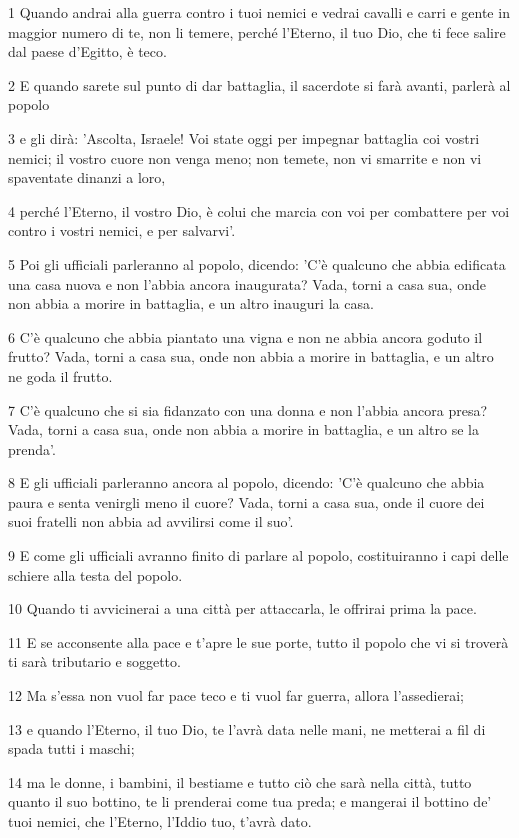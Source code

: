 \par 1 Quando andrai alla guerra contro i tuoi nemici e vedrai cavalli e carri e gente in maggior numero di te, non li temere, perché l'Eterno, il tuo Dio, che ti fece salire dal paese d'Egitto, è teco.
\par 2 E quando sarete sul punto di dar battaglia, il sacerdote si farà avanti, parlerà al popolo
\par 3 e gli dirà: 'Ascolta, Israele! Voi state oggi per impegnar battaglia coi vostri nemici; il vostro cuore non venga meno; non temete, non vi smarrite e non vi spaventate dinanzi a loro,
\par 4 perché l'Eterno, il vostro Dio, è colui che marcia con voi per combattere per voi contro i vostri nemici, e per salvarvi'.
\par 5 Poi gli ufficiali parleranno al popolo, dicendo: 'C'è qualcuno che abbia edificata una casa nuova e non l'abbia ancora inaugurata? Vada, torni a casa sua, onde non abbia a morire in battaglia, e un altro inauguri la casa.
\par 6 C'è qualcuno che abbia piantato una vigna e non ne abbia ancora goduto il frutto? Vada, torni a casa sua, onde non abbia a morire in battaglia, e un altro ne goda il frutto.
\par 7 C'è qualcuno che si sia fidanzato con una donna e non l'abbia ancora presa? Vada, torni a casa sua, onde non abbia a morire in battaglia, e un altro se la prenda'.
\par 8 E gli ufficiali parleranno ancora al popolo, dicendo: 'C'è qualcuno che abbia paura e senta venirgli meno il cuore? Vada, torni a casa sua, onde il cuore dei suoi fratelli non abbia ad avvilirsi come il suo'.
\par 9 E come gli ufficiali avranno finito di parlare al popolo, costituiranno i capi delle schiere alla testa del popolo.
\par 10 Quando ti avvicinerai a una città per attaccarla, le offrirai prima la pace.
\par 11 E se acconsente alla pace e t'apre le sue porte, tutto il popolo che vi si troverà ti sarà tributario e soggetto.
\par 12 Ma s'essa non vuol far pace teco e ti vuol far guerra, allora l'assedierai;
\par 13 e quando l'Eterno, il tuo Dio, te l'avrà data nelle mani, ne metterai a fil di spada tutti i maschi;
\par 14 ma le donne, i bambini, il bestiame e tutto ciò che sarà nella città, tutto quanto il suo bottino, te li prenderai come tua preda; e mangerai il bottino de' tuoi nemici, che l'Eterno, l'Iddio tuo, t'avrà dato.
